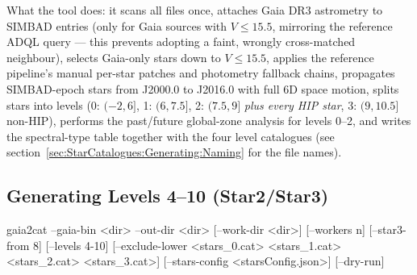 What the tool does: it scans all  files once, attaches Gaia DR3
astrometry to SIMBAD entries (only for Gaia sources with $V \le 15.5$,
mirroring the reference ADQL query --- this prevents adopting a faint,
wrongly cross-matched neighbour), selects Gaia-only stars down to
$V \le 15.5$, applies the reference pipeline's manual per-star patches and
photometry fallback chains, propagates SIMBAD-epoch stars from J2000.0 to
J2016.0 with full 6D space motion, splits stars into levels
(0: $(-2,6]$, 1: $(6,7.5]$, 2: $(7.5,9]$ \emph{plus every HIP star},
3: $(9,10.5]$ non-HIP), performs the past/future global-zone analysis for
levels 0--2, and writes the spectral-type table
 together with the four level catalogues
(see section~\ref{sec:StarCatalogues:Generating:Naming} for the file
names).

\subsection{Generating Levels 4--10 (Star2/Star3)}
\label{sec:StarCatalogues:Generating:lv410}

\begin{commands}
gaia2cat --gaia-bin <dir> --out-dir <dir> [--work-dir <dir>]
             [--workers n] [--star3-from 8] [--levels 4-10]
             [--exclude-lower <stars_0.cat> <stars_1.cat>
             <stars_2.cat> <stars_3.cat>]
             [--stars-config <starsConfig.json>] [--dry-run]
\end{commands}


